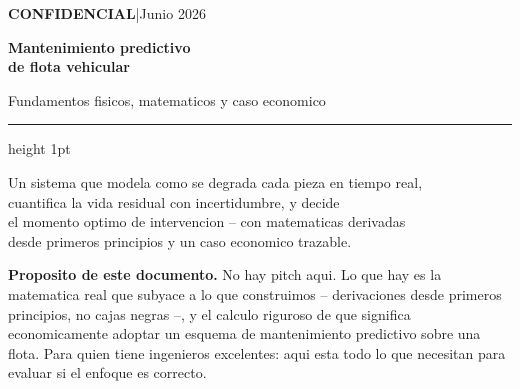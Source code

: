 \documentclass[10.5pt,a4paper]{article}
\begin{document}
\thispagestyle{empty}
\vspace*{1.1cm}

{\color{muted}\small\textbf{CONFIDENCIAL}\quad|\quad Junio 2026}

\vspace{0.9cm}

{\fontsize{28}{33}\selectfont\bfseries\color{primary}
Mantenimiento predictivo\\de flota vehicular}

\vspace{0.4cm}

{\fontsize{13}{18}\selectfont\color{accent}
Fundamentos fisicos, matematicos y caso economico}

\vspace{0.5cm}
{\color{bordercol}\hrule height 1pt}
\vspace{0.5cm}

{\large\color{muted}
Un sistema que modela como se degrada cada pieza en tiempo real,\\
cuantifica la vida residual con incertidumbre, y decide\\
el momento optimo de intervencion -- con matematicas derivadas\\
desde primeros principios y un caso economico trazable.
}

\vspace{1.0cm}

\begin{notebox}
\textbf{Proposito de este documento.}
No hay pitch aqui. Lo que hay es la matematica real que subyace a lo que construimos
-- derivaciones desde primeros principios, no cajas negras --, y el calculo riguroso
de que significa economicamente adoptar un esquema de mantenimiento predictivo
sobre una flota. Para quien tiene ingenieros excelentes: aqui esta todo lo que
necesitan para evaluar si el enfoque es correcto.
\end{notebox}

\vspace{0.9cm}
\end{document}
